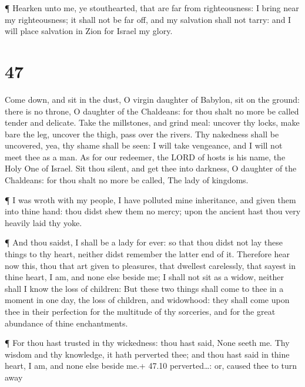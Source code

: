  ¶ Hearken unto me, ye stouthearted, that are far from
righteousness:  I bring near my righteousness; it shall not
be far off, and my salvation shall not tarry: and I will place salvation
in Zion for Israel my glory.

\hypertarget{section-46}{%
\section{47}\label{section-46}}

 Come down, and sit in the dust, O virgin daughter of
Babylon, sit on the ground: there is no throne, O daughter of the
Chaldeans: for thou shalt no more be called tender and delicate.
 Take the millstones, and grind meal: uncover thy locks,
make bare the leg, uncover the thigh, pass over the rivers. 
Thy nakedness shall be uncovered, yea, thy shame shall be seen: I will
take vengeance, and I will not meet thee as a man.  As for
our redeemer, the LORD of hosts is his name, the Holy One of Israel.
 Sit thou silent, and get thee into darkness, O daughter of
the Chaldeans: for thou shalt no more be called, The lady of kingdoms.

 ¶ I was wroth with my people, I have polluted mine
inheritance, and given them into thine hand: thou didst shew them no
mercy; upon the ancient hast thou very heavily laid thy yoke.

 ¶ And thou saidst, I shall be a lady for ever: so that thou
didst not lay these things to thy heart, neither didst remember the
latter end of it.  Therefore hear now this, thou that art
given to pleasures, that dwellest carelessly, that sayest in thine
heart, I am, and none else beside me; I shall not sit as a widow,
neither shall I know the loss of children:  But these two
things shall come to thee in a moment in one day, the loss of children,
and widowhood: they shall come upon thee in their perfection for the
multitude of thy sorceries, and for the great abundance of thine
enchantments.

 ¶ For thou hast trusted in thy wickedness: thou hast said,
None seeth me. Thy wisdom and thy knowledge, it hath perverted thee; and
thou hast said in thine heart, I am, and none else beside me.+ 47.10
perverted\ldots: or, caused thee to turn away

